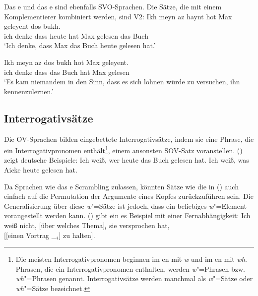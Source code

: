\noindent
Das e und das e sind ebenfalls SVO-Sprachen. Die Sätze, die mit einem
Komplementierer kombiniert werden, sind V2:
\eal
\ex
\gll Ikh meyn  az   haynt hot Max geleyent dos bukh.\footnotemark\\
     ich denke dass heute hat Max gelesen das Buch\\\yiddish
{}
\glt `Ich denke, dass Max das Buch heute gelesen hat.'

\ex%
\gll Ikh meyn  az   dos bukh hot Max geleyent.\\
     ich denke dass das Buch hat Max gelesen\\

\zl
\ea
{}
\glt `Es kam niemandem in den Sinn, dass es sich lohnen würde zu versuchen, ihn kennenzulernen.'
\z

\subsection{Interrogativsätze}
\label{sec-phen-interrogatives}

Die OV-Sprachen bilden eingebettete Interrogativsätze, indem sie eine Phrase, die ein
Interrogativpronomen enthält\footnote{
Die meisten Interrogativpronomen beginnen im en mit \emph{w} und im en mit \emph{wh}. Phrasen,
die ein Interrogativpronomen enthalten, werden \emph{w}"=Phrasen bzw. \emph{wh}"=Phrasen
genannt. Interrogativsätze werden manchmal als \emph{w}"=Sätze oder \emph{wh}"=Sätze bezeichnet.
}, einem
ansonsten SOV-Satz voranstellen. () zeigt deutsche Beispiele:
\eal
\ex Ich weiß, wer heute das Buch gelesen hat. \german
\ex Ich weiß, was Aicke heute gelesen hat.
\zl

\noindent
Da Sprachen wie das e Scrambling zulassen, könnten Sätze wie die in () auch einfach auf
die Permutation der Argumente eines Kopfes zurückzuführen sein. Die Generalisierung über diese \emph{w}"=Sätze
ist jedoch, dass ein beliebiges \emph{w}"=Element vorangestellt werden kann. () gibt ein es Beispiel mit einer Fernabhängigkeit:
\ea
\label{ex-wissen-Vortrag-halen-nonlocal}
Ich weiß nicht, [über welches Thema]$_i$ sie versprochen hat,\\
{}[[einen Vortrag \_$_i$] zu halten].
\z


